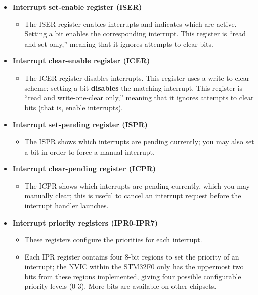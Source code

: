 \documentclass[11pt,fleqn]{book} %
\begin{document}
\begin{itemize}
    \item \textbf{Interrupt set-enable register (ISER)}
        \begin{itemize}
            \item The ISER register enables interrupts and indicates which are active.
            Setting a bit enables the corresponding interrupt. This register is ``read and set only,'' meaning that it ignores attempts to clear bits. 
        \end{itemize}
    \item \textbf{Interrupt clear-enable register (ICER)}
        \begin{itemize}
            \item The ICER register disables interrupts.
            This register uses a write to clear scheme: setting a bit \textbf{disables} the matching interrupt. This register is ``read and write-one-clear only,'' meaning that it ignores attempts to clear bits (that is, enable interrupts). 
        \end{itemize}
    \item \textbf{Interrupt set-pending register (ISPR)}
        \begin{itemize}
            \item The ISPR shows which interrupts are pending currently; you may also set a bit in order to force a manual interrupt. 
        \end{itemize}
    \item \textbf{Interrupt clear-pending register (ICPR)}
        \begin{itemize}
            \item The ICPR shows which interrupts are pending currently, which you may manually clear; this is useful to cancel an interrupt request before the interrupt handler launches.
        \end{itemize}
    \item \textbf{Interrupt priority registers (IPR0-IPR7)}
        \begin{itemize}
            \item These registers configure the priorities for each interrupt. 
            \item Each IPR register contains four 8-bit regions to set the priority of an interrupt; the NVIC within the STM32F0 only has the uppermost two bits from these regions implemented, giving four possible configurable priority levels (0-3). More bits are available on other chipsets.           
        \end{itemize}
\end{itemize}
\end{document}
